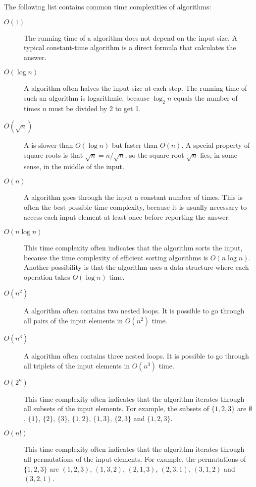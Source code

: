 
The following list contains common time complexities
of algorithms:

\begin{description}
\item[$O(1)$]
The running time of a  algorithm
does not depend on the input size.
A typical constant-time algorithm is a direct
formula that calculates the answer.

\item[$O(\log n)$]
A  algorithm often halves
the input size at each step.
The running time of such an algorithm
is logarithmic, because
$\log_2 n$ equals the number of times
$n$ must be divided by 2 to get 1.

\item[$O(\sqrt n)$]
A  is slower than
$O(\log n)$ but faster than $O(n)$.
A special property of square roots is that
$\sqrt n = n/\sqrt n$, so the square root $\sqrt n$ lies,
in some sense, in the middle of the input.

\item[$O(n)$]
A  algorithm goes through the input
a constant number of times.
This is often the best possible time complexity,
because it is usually necessary to access each
input element at least once before
reporting the answer.

\item[$O(n \log n)$]
This time complexity often indicates that the
algorithm sorts the input,
because the time complexity of efficient
sorting algorithms is $O(n \log n)$.
Another possibility is that the algorithm
uses a data structure where each operation
takes $O(\log n)$ time.

\item[$O(n^2)$]
A  algorithm often contains
two nested loops.
It is possible to go through all pairs of
the input elements in $O(n^2)$ time.

\item[$O(n^3)$]
A  algorithm often contains
three nested loops.
It is possible to go through all triplets of
the input elements in $O(n^3)$ time.

\item[$O(2^n)$]
This time complexity often indicates that
the algorithm iterates through all
subsets of the input elements.
For example, the subsets of $\{1,2,3\}$ are
$\emptyset$, $\{1\}$, $\{2\}$, $\{3\}$, $\{1,2\}$,
$\{1,3\}$, $\{2,3\}$ and $\{1,2,3\}$.

\item[$O(n!)$]
This time complexity often indicates that
the algorithm iterates through all
permutations of the input elements.
For example, the permutations of $\{1,2,3\}$ are
$(1,2,3)$, $(1,3,2)$, $(2,1,3)$, $(2,3,1)$,
$(3,1,2)$ and $(3,2,1)$.

\end{description}

